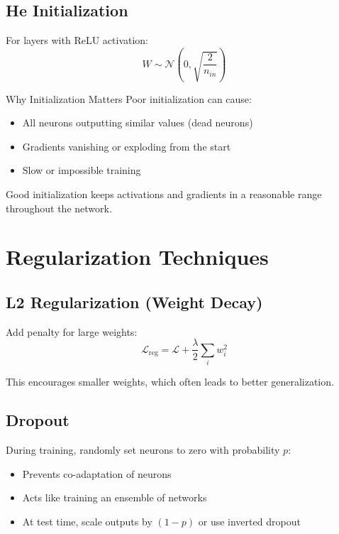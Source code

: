 \subsection{He Initialization}

For layers with ReLU activation:
\[
W \sim \mathcal{N}\left(0, \sqrt{\frac{2}{n_{in}}}\right)
\]

\begin{infobox}{Why Initialization Matters}
Poor initialization can cause:
\begin{itemize}
    \item All neurons outputting similar values (dead neurons)
    \item Gradients vanishing or exploding from the start
    \item Slow or impossible training
\end{itemize}
Good initialization keeps activations and gradients in a reasonable range throughout the network.
\end{infobox}

\section{Regularization Techniques}

\subsection{L2 Regularization (Weight Decay)}

Add penalty for large weights:
\[
\mathcal{L}_{\text{reg}} = \mathcal{L} + \frac{\lambda}{2} \sum_i w_i^2
\]

This encourages smaller weights, which often leads to better generalization.

\subsection{Dropout}

During training, randomly set neurons to zero with probability $p$:
\begin{itemize}
    \item Prevents co-adaptation of neurons
    \item Acts like training an ensemble of networks
    \item At test time, scale outputs by $(1-p)$ or use inverted dropout
\end{itemize}

